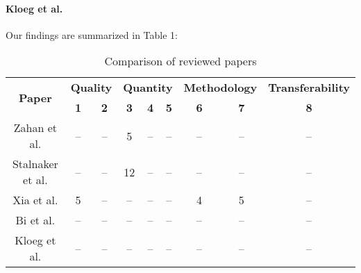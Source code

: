 \paragraph{Kloeg et al. \cite{article:business-sbom}}

\noindent Our findings are summarized in Table 1:

\begin{table}[h]
    \centering
    \begin{tabular}{c|c|c|c|c|c|c|c|c}
        \multirow{2}{*}{\textbf{Paper}}                 & \multicolumn{2}{c|}{\textbf{Quality}} & \multicolumn{3}{c|}{\textbf{Quantity}} & \multicolumn{2}{c|}{\textbf{Methodology}} & \textbf{Transferability}                                                     \\
        \cline{2-9}                                     & \textbf{1}                            & \textbf{2}                             & \textbf{3}                                & \textbf{4}               & \textbf{5} & \textbf{6} & \textbf{7} & \textbf{8} \\
        \hline
        \hline
        Zahan et al. \cite{article:sbom-required}       & --                                    & --                                     & 5                                         & --                       & --         & --         & --         & --         \\
        \hline
        Stalnaker et al. \cite{article:software-bom}    & --                                    & --                                     & 12                                        & --                       & --         & --         & --         & --         \\
        \hline
        Xia et al. \cite{article:sbom-study}            & 5                                     & --                                     & --                                        & --                       & --         & 4          & 5          & --         \\
        \hline
        Bi et al. \cite{article:sboms-issues-solutions} & --                                    & --                                     & --                                        & --                       & --         & --         & --         & --         \\
        \hline
        Kloeg et al. \cite{article:business-sbom}       & --                                    & --                                     & --                                        & --                       & --         & --         & --         & --
    \end{tabular}
    \caption{Comparison of reviewed papers}
    \label{tab:comparison}
\end{table}
